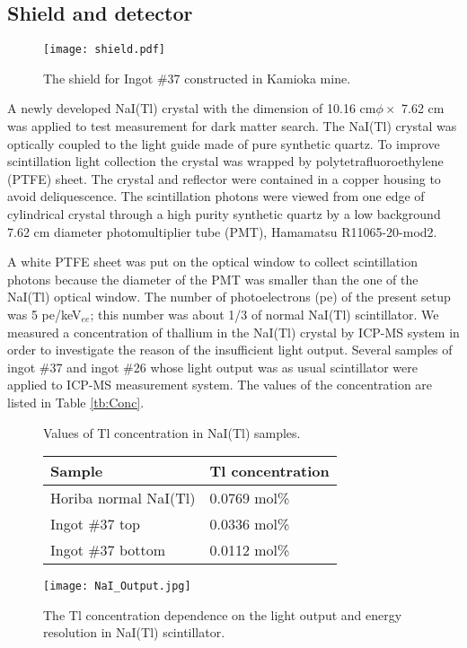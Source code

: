 \documentclass{jpsj-suppl} %
\begin{document}
\subsection{Shield and detector}
\begin{wrapfigure}{r}{0.45\textwidth}
\centering
\texttt{[image: shield.pdf]}
\caption{The shield for Ingot \#37 constructed in Kamioka mine.}
\label{fg:shield}
\end{wrapfigure}


A newly developed NaI(Tl) crystal with the dimension of 10.16 cm$\phi\times$ 7.62 cm 
was applied to test measurement for dark matter search.
The NaI(Tl) crystal was optically coupled to the light guide made of pure synthetic quartz.
To improve scintillation light collection the crystal was wrapped by polytetrafluoroethylene (PTFE)
sheet.
The crystal and reflector were contained in a copper housing to avoid deliquescence.
The scintillation photons were viewed from one edge of cylindrical crystal through 
a high purity synthetic quartz by a low background 7.62 cm diameter 
photomultiplier tube (PMT), Hamamatsu R11065-20-mod2.

A white PTFE sheet was put on the optical window to collect scintillation photons because
the diameter of the PMT was smaller than the one of the NaI(Tl) optical window.
The number of photoelectrons (pe) of the present setup was 5 pe/keV$_{ee}$; 
this number was about 1/3 of normal NaI(Tl) scintillator.
We measured a concentration of thallium in the NaI(Tl) crystal by ICP-MS system in order to
investigate the reason of the insufficient light output.
Several samples of ingot \#37 and ingot \#26 whose light output was as usual scintillator
were applied to ICP-MS measurement system.
The values of the concentration are listed in Table \ref{tb:Conc}.

\begin{figure}[ht]
\begin{minipage}{0.5\textwidth}
%
\makeatletter
\def\@captype{table}
\makeatother
\centering
\caption{Values of Tl concentration in NaI(Tl) samples.}
\label{tb:Conc}
\begin{tabular}{l|l} \hline
Sample & Tl concentration \\ \hline
Horiba normal NaI(Tl) & 0.0769 mol\% \\
Ingot \#37 top & 0.0336 mol\%\\
Ingot \#37 bottom & 0.0112 mol\%\\ \hline
\end{tabular}
%
\end{minipage}
\makeatletter
\def\@captype{figure}
\makeatother
\begin{minipage}{0.55\textwidth}
\centering
\texttt{[image: NaI\_Output.jpg]}
\caption{The Tl concentration dependence on the light output and energy resolution in 
NaI(Tl) scintillator\protect\cite{LightYield}.}
\label{fg:NaIOut}
\end{minipage}
\end{figure}
\end{document}
